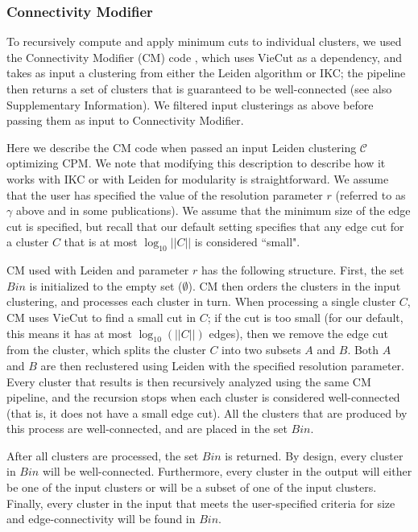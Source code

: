 \documentclass[11pt]{article}   	%
\begin{document}
\subsubsection{Connectivity Modifier} To recursively compute and apply minimum cuts to individual clusters, we used the 
Connectivity Modifier (CM) code  \citep{cm2022}, which uses VieCut \citep{Henzinger2018,Henzinger2019} as a dependency, and takes as input a clustering from either the Leiden algorithm or IKC; the pipeline then returns a set of clusters that is guaranteed to be well-connected (see also Supplementary Information). We filtered input clusterings as above before passing them as input to Connectivity Modifier. 

Here we describe the CM code when passed an input  Leiden clustering $\mathcal{C}$  optimizing CPM. We note that modifying this description to describe how it works with IKC or with Leiden for modularity is straightforward.
We assume that the user has specified the value of the resolution parameter $r$ (referred to as $\gamma$ above and in some publications).
We assume that the minimum size of the edge cut is specified, but recall that our default setting specifies that any edge cut for a cluster $C$ that is at most $ \log _{10} ||C||$ is 
considered ``small".

CM used with Leiden and parameter $r$ has the following structure.
First, the set $Bin$ is initialized to the empty set  ($\emptyset$).
CM  then orders the clusters in the input clustering, and   processes each cluster in  turn.
When processing a single cluster $C$,
CM uses VieCut to find a small cut in $C$;  if the cut is too small (for our default, this means it has at most $\log_{10}(||C||)$ edges), then
we remove the edge cut from the cluster, which splits the cluster $C$ into two  subsets $A$ and $B$.
Both $A$ and $B$ are then reclustered using Leiden with the specified resolution parameter.
Every cluster that results is then recursively analyzed using the same CM pipeline, and the recursion stops when each cluster is considered well-connected (that is, it does not have a small edge cut).
All the clusters that are produced by this process are well-connected, and are placed in the set $Bin$.

After all clusters are processed, the set $Bin$ is returned. By design, every cluster in  $Bin$ will be well-connected.
Furthermore, every cluster in the output will either be one of the input clusters or will be a subset of one of the input clusters.
Finally, every cluster in the input that meets the user-specified criteria for size and edge-connectivity will be found in $Bin$.
\end{document}
